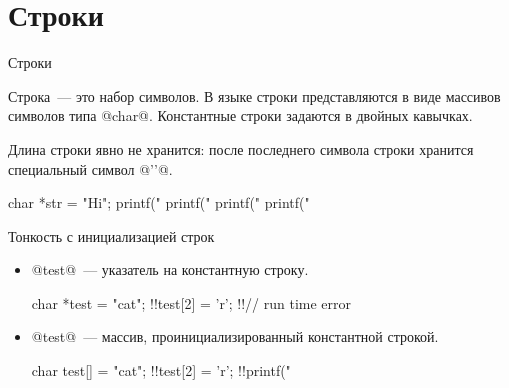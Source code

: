 \section{Строки}

\begin{frame}[fragile]{Строки}

  Строка~--- это набор символов. В языке  строки представляются в виде
  массивов символов типа @char@. Константные строки задаются в двойных
  кавычках.

  \pause
  Длина строки явно не хранится: после последнего символа строки хранится
  специальный символ @'\0'@.

  \pause
  \begin{clisting}
    char *str = "Hi";
    printf("%
    printf("%
    printf("%
    printf("%
  \end{clisting}


\end{frame}

\begin{frame}[fragile]{Тонкость с инициализацией строк}

  \begin{itemize}
    \item
      @test@~--- указатель на константную строку.
      \begin{clisting}[escapechar=!]
        char *test = "cat";
        !!test[2] = 'r'; !!// run time error
      \end{clisting}

    \item
      @test@~--- массив, проинициализированный константной строкой.
      \begin{clisting}[escapechar=!]
        char test[] = "cat";
        !!test[2] = 'r';
        !!printf("%
      \end{clisting}

  \end{itemize}

\end{frame}





